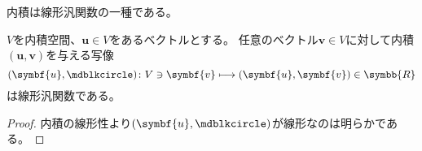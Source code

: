 \documentclass[../sotsu.tex]{subfiles}
\begin{document}
内積は線形汎関数の一種である。

\begin{proposition}
    $V$を内積空間、$\symbf{u} \in V$をあるベクトルとする。
    任意のベクトル$\symbf{v} \in V$に対して内積$(\symbf{u}, \symbf{v})$を与える写像
    \begin{equation}
        (\symbf{u}, \bigdot) \colon V \ni \symbf{v} \longmapsto (\symbf{u}, \symbf{v}) \in \symbb{R}
    \end{equation}
    は線形汎関数である。
\end{proposition}

\begin{proof}
    内積の線形性より$(\symbf{u}, \bigdot)$が線形なのは明らかである。
\end{proof}
\end{document}
